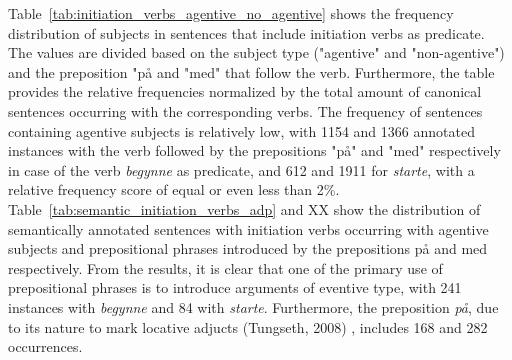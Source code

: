 \documentclass{article}
\begin{document}
Table~\ref{tab:initiation_verbs_agentive_no_agentive} shows the frequency distribution of subjects in sentences that include initiation verbs as predicate. The values are divided based on the subject type ("agentive" and "non-agentive") and the preposition "på and "med" that follow the verb. Furthermore, the table provides the relative frequencies normalized by the total amount of canonical sentences occurring with the corresponding verbs.
The frequency of sentences containing agentive subjects is relatively low, with 1154 and 1366 annotated instances with the verb followed by the prepositions "på" and "med" respectively in case of the verb \emph{begynne} as predicate, and 612 and 1911 for \emph{starte}, with a relative frequency score of equal or even less than 2\%.
Table~\ref{tab:semantic_initiation_verbs_adp} and XX show the distribution of semantically annotated sentences with initiation verbs occurring with agentive subjects and prepositional phrases introduced by the prepositions på and med respectively. From the results, it is clear that one of the primary use of prepositional phrases is to introduce arguments of eventive type, with 241 instances with \emph{begynne} and 84 with \emph{starte}. Furthermore, the preposition \emph{på}, due to its nature to mark locative adjucts (Tungseth, 2008)
, includes 168 and 282 occurrences. 
\end{document}
